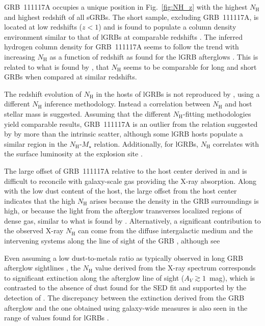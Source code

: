 \documentclass{aa}    %
\begin{document}
GRB~111117A occupies a unique position in Fig.~\ref{fig:NH_z} with the highest
$N_\mathrm{H}$ and highest redshift of all sGRBs. The short sample, excluding
GRB~111117A, is located at low redshifts ($z < 1$) and is found to populate a
column density environment similar to that of lGRBs at comparable redshifts
\citep{DAvanzo2014a}. The inferred hydrogen column density for GRB~111117A seems
to follow the trend with increasing $N_\mathrm{H}$ as a function of redshift as found for
the lGRB afterglows \citep{Campana2010, Starling2013, Arcodia2016}. This is
related to what is found by \citet{Kopac2012, Margutti2013}, that $N_\mathrm{H}$ seems to
be comparable for long and short GRBs when compared at similar redshifts.

The redshift evolution of $N_\mathrm{H}$ in the hosts of lGRBs is not reproduced by
\citet{Buchner2017}, using a different $N_\mathrm{H}$ inference methodology. Instead a
correlation between $N_\mathrm{H}$ and host stellar mass is suggested. Assuming that the
different $N_\mathrm{H}$-fitting methodologies yield comparable results, GRB~111117A is
an outlier from the relation suggested by \citet{Buchner2017} by more than the
intrinsic scatter, although some lGRB hosts populate a similar region in the
$N_\mathrm{H}$-$M_\star$ relation. Additionally, for lGRBs, $N_\mathrm{H}$ correlates with the
surface luminosity at the explosion site \citep{Lyman2017}. 

The large offset of GRB~111117A relative to the host center derived in
\citet{Margutti2012} and \citet{Sakamoto2013} is difficult to reconcile with
galaxy-scale gas providing the X-ray absorption. Along with the low dust content
of the host, the large offset from the host center indicates that the high
$N_\mathrm{H}$ arises because the density in the GRB surroundings is high, or
because the light from the afterglow transverses localized regions of dense gas, similar to what is found by \citep{}.
Alternatively, a significant contribution to the observed X-ray $N_\mathrm{H}$
can come from the diffuse intergalactic medium and the intervening systems along
the line of sight of the GRB \citep{Campana2012, Arcodia2016}, although see \citep{}

Even assuming a low dust-to-metals ratio as typically observed in long GRB
afterglow sightlines \citep{Galama2001, Schady2010, Covino2013}, the
$N_\mathrm{H}$ value derived from the X-ray spectrum corresponds to significant
extinction along the afterglow line of sight ($A_V \gtrsim 1$~mag), which is
contrasted to the absence of dust found for the SED fit and supported by the
detection of \lya{}. The discrepancy between the extinction derived from the GRB
afterglow and the one obtained using galaxy-wide measures is also seen in the
range of values found for lGRBs \citep{Perley2013a, Covino2013}.
\end{document}
